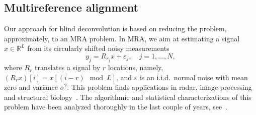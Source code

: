 \documentclass[journal]{IEEEtran}
\numberwithin{equation}{section}
\numberwithin{figure}{section}
\theoremstyle{plain}
\theoremstyle{definition}
\theoremstyle{remark}
\theoremstyle{plain}
\theoremstyle{remark}
\theoremstyle{plain}
\theoremstyle{plain}
\newcommand{\RL}{\mathbb{R}^L}
\begin{document}
\subsection{Multireference alignment} \label{sec:mra}

Our approach for blind deconvolution is based on reducing the problem, approximately, to an MRA problem.
In MRA, we aim at estimating a signal $x\in\RL$ from its circularly shifted noisy measurements
\begin{equation} \label{eq:mra}
y_j = R_{r_j}x + \varepsilon_j, \quad j = 1,\ldots,N,
\end{equation}
where $R_{r}$ translates a signal by $r$ locations, namely, $(R_rx)[i] = x[(i-r)\mod L]$, and $\varepsilon$ is an i.i.d.\ normal noise with mean zero and variance $\sigma^2$. This problem finds applications in radar, image processing and structural biology~\cite{zwart2003fast,foroosh2002extension,diamond1992multiple}. The algorithmic and statistical characterizations of this problem have been analyzed thoroughly in the last couple of years, see~\cite{bendory2017bispectrum,bandeira2014multireference,bandeira2017optimal,perry2017sample,boumal2017heterogeneous,abbe2017multireference,abbe2017sample}.
\end{document}
